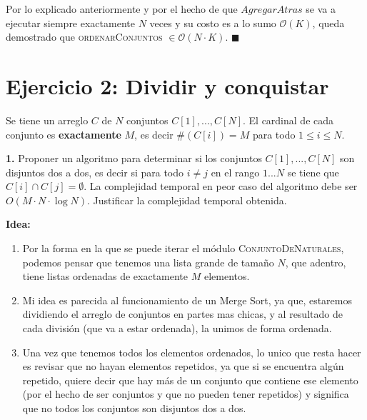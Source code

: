 \documentclass[10pt, a4paper]{article}
\newcommand{\bigO}{\mathcal{O}}
\begin{document}
Por lo explicado anteriormente y por el hecho de que $AgregarAtras$ se va a ejecutar siempre exactamente $N$ veces y su costo es a lo sumo $\bigO(K)$, queda demostrado que \textsc{ordenarConjuntos} $\in \bigO(N \cdot K)$. $\blacksquare$

\section*{Ejercicio 2: Dividir y conquistar}

Se tiene un arreglo $C$ de $N$ conjuntos $C[1],...,C[N]$. El cardinal de cada conjunto es \textbf{exactamente} $M$, es decir \#$(C[i]) = M$ para todo $1 \leq i \leq N$.

\textbf{1.} Proponer un algoritmo para determinar si los conjuntos $C[1],...,C[N]$ son disjuntos dos a dos, es decir si para todo $i \neq j$ en el rango $1...N$ se tiene que $C[i] \cap C[j] = \emptyset$. La complejidad temporal en peor caso del algoritmo debe ser $O(M \cdot N \cdot \log N)$. Justificar la complejidad temporal obtenida.

\vspace{0.5em}

\textbf{Idea: }
\begin{enumerate}
  \item Por la forma en la que se puede iterar el m\'odulo \textsc{ConjuntoDeNaturales}, podemos pensar que tenemos una lista grande de tama\~no $N$, que adentro, tiene listas ordenadas de exactamente $M$ elementos.
  \item Mi idea es parecida al funcionamiento de un Merge Sort, ya que, estaremos dividiendo el arreglo de conjuntos en partes mas chicas, y al resultado de cada divisi\'on (que va a estar ordenada), la unimos de forma ordenada.
  \item Una vez que tenemos todos los elementos ordenados, lo unico que resta hacer es revisar que no hayan elementos repetidos, ya que si se encuentra alg\'un repetido, quiere decir que hay m\'as de un conjunto que contiene ese elemento (por el hecho de ser conjuntos y que no pueden tener repetidos) y significa que no todos los conjuntos son disjuntos dos a dos.
\end{enumerate}
\end{document}
